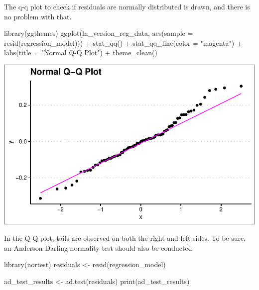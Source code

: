 \documentclass[
  11pt,
  a4paper,
  DIV=11,
  numbers=noendperiod]{scrartcl}
\newenvironment{Shaded}{\begin{snugshade}}{\end{snugshade}}
\newcommand{\AttributeTok}[1]{\textcolor[rgb]{0.40,0.45,0.13}{#1}}
\newcommand{\FunctionTok}[1]{\textcolor[rgb]{0.28,0.35,0.67}{#1}}
\newcommand{\NormalTok}[1]{\textcolor[rgb]{0.00,0.23,0.31}{#1}}
\newcommand{\OtherTok}[1]{\textcolor[rgb]{0.00,0.23,0.31}{#1}}
\newcommand{\SpecialCharTok}[1]{\textcolor[rgb]{0.37,0.37,0.37}{#1}}
\newcommand{\StringTok}[1]{\textcolor[rgb]{0.13,0.47,0.30}{#1}}
\begin{document}
The q-q plot to check if residuals are normally distributed is drawn,
and there is no problem with that.

\begin{Shaded}
\begin{Highlighting}[]
\FunctionTok{library}\NormalTok{(ggthemes)}
\FunctionTok{ggplot}\NormalTok{(ln\_version\_reg\_data, }\FunctionTok{aes}\NormalTok{(}\AttributeTok{sample =} \FunctionTok{resid}\NormalTok{(regression\_model))) }\SpecialCharTok{+}
  \FunctionTok{stat\_qq}\NormalTok{() }\SpecialCharTok{+}
  \FunctionTok{stat\_qq\_line}\NormalTok{(}\AttributeTok{color =} \StringTok{"magenta"}\NormalTok{) }\SpecialCharTok{+}
  \FunctionTok{labs}\NormalTok{(}\AttributeTok{title =} \StringTok{"Normal Q{-}Q Plot"}\NormalTok{) }\SpecialCharTok{+}
  \FunctionTok{theme\_clean}\NormalTok{()}
\end{Highlighting}
\end{Shaded}

\includegraphics{project_files/figure-pdf/unnamed-chunk-42-1.pdf}

In the Q-Q plot, tails are observed on both the right and left sides. To
be sure, an Anderson-Darling normality test should also be conducted.

\begin{Shaded}
\begin{Highlighting}[]
\FunctionTok{library}\NormalTok{(nortest)}
\NormalTok{residuals }\OtherTok{\textless{}{-}} \FunctionTok{resid}\NormalTok{(regression\_model)}

\NormalTok{ad\_test\_results }\OtherTok{\textless{}{-}} \FunctionTok{ad.test}\NormalTok{(residuals)}
\FunctionTok{print}\NormalTok{(ad\_test\_results)}
\end{Highlighting}
\end{Shaded}
\end{document}
